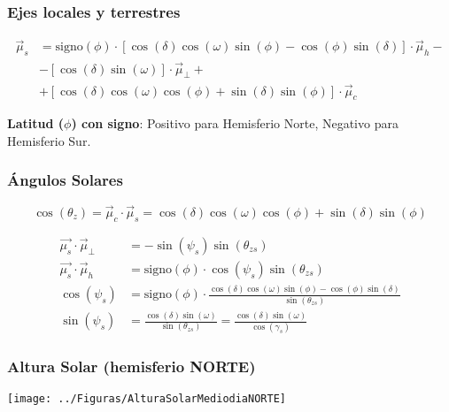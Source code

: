 \documentclass[xcolor=dvipsnames]{beamer}
\begin{document}
\begin{frame}
  \frametitle{Ejes locales y terrestres}

\begin{align}
  \vec{\mu}_{s} & =\mathrm{signo}(\phi)\cdot\left[\cos\left(\delta\right)\cos\left(\omega\right)\sin\left(\phi\right)-\cos\left(\phi\right)\sin\left(\delta\right)\right]\cdot\vec{\mu}_{h}-\nonumber \\
  & -\left[\cos\left(\delta\right)\sin\left(\omega\right)\right]\cdot\vec{\mu}_{\bot}+\\
  &
  +\left[\cos\left(\delta\right)\cos\left(\omega\right)\cos\left(\phi\right)+\sin\left(\delta\right)\sin\left(\phi\right)\right]\cdot\vec{\mu}_{c}\nonumber \end{align}
\begin{block}{}
  \textbf{Latitud ($\phi$) con signo}: Positivo para Hemisferio Norte,
  Negativo para Hemisferio Sur.
\end{block}

\end{frame}

\begin{frame}
  \frametitle{Ángulos Solares}

\[
\cos\left(\theta_{z}\right)=\vec{\mu}_{c}\cdot\vec{\mu}_{s}=\cos\left(\delta\right)\cos\left(\omega\right)\cos\left(\phi\right)+\sin\left(\delta\right)\sin\left(\phi\right)\]

\begin{align*}
  \vec{\mu_{s}}\cdot\vec{\mu}_{\bot} & =-\sin\left(\psi_{s}\right)\sin\left(\theta_{zs}\right)\\
  \vec{\mu_{s}}\cdot\vec{\mu}_{h} & =\mathrm{signo}(\phi)\cdot\cos\left(\psi_{s}\right)\sin\left(\theta_{zs}\right)\\
  \cos\left(\psi_{s}\right) & =\mathrm{signo}(\phi)\cdot\frac{\cos\left(\delta\right)\cos\left(\omega\right)\sin\left(\phi\right)-\cos\left(\phi\right)\sin\left(\delta\right)}{\sin\left(\theta_{zs}\right)}\\
  \sin(\psi_{s}) &
  =\frac{\cos(\delta)\sin(\omega)}{\sin(\theta_{zs})}=\frac{\cos(\delta)\sin(\omega)}{\cos(\gamma_{s})}\end{align*}



\end{frame}

\begin{frame}[plain]
  \frametitle{Altura Solar (hemisferio NORTE)}

  \begin{center}
    \texttt{[image: ../Figuras/AlturaSolarMediodiaNORTE]}
    \par\end{center}


\end{frame}
\end{document}
